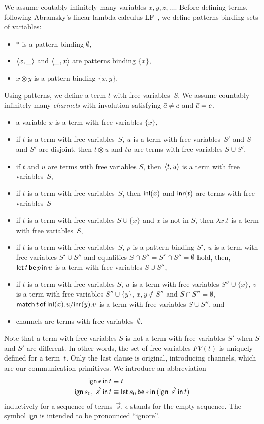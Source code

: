 We assume coutably infinitely many variables $x, y, z, \ldots$.
Before defining terms, following Abramsky's linear lambda calculus
LF~\citep{abramsky1993computational}, we define patterns
binding sets of variables:
\begin{itemize}
 \item $\ast$ is a pattern binding $\emptyset$,
 \item $\langle{x,\_}\rangle$ and $\langle{\_,x}\rangle$ are patterns binding $\{x\}$,
 \item $x\otimes y$ is a pattern binding $\{x,y\}$.
\end{itemize}
Using patterns, we define a term $t$ with free variables~$S$.
We assume countably infinitely many \textit{channels}
with involution satisfying $\bar{c}\neq c$ and $\bar{\bar{c}} = c$.
\begin{itemize}
 \item a variable $x$ is a term with free variables $\{x\}$,
 \item if $t$ is a term with free variables~$S$, $u$ is a term with
       free variables~$S'$ and $S$ and $S'$ are disjoint, then $t\otimes
       u$ and
       $tu$ are terms with free variables $S\cup S'$,
 \item if $t$ and $u$ are terms with free variables $S$, then
       $\langle{t,u}\rangle$ is a term with free variables~$S$,
 \item if $t$ is a term with free variables~$S$, then
       $\mathsf{inl}({x})$ and $\mathsf{inr}({t})$ are terms with free variables~$S$
 \item if $t$ is a term with free variables $S\cup \{x\}$ and $x$ is not
       in $S$, then $\lambda x.t$ is a term with free variables~$S$,
 \item if $t$ is a term with free variables~$S$, $p$ is a pattern
       binding $S'$, $u$ is a term with free variables $S'\cup S''$ and equalities
       $S\cap S'' = S'\cap S'' = \emptyset$ hold, then,
       $\mathsf{let }\,{t}\,\mathsf{ be }\,{p}\,\mathsf{ in }\,{u}$ is a term with free variables $S\cup S''$,
 \item if $t$ is a term with free variables $S$,
       $u$ is a term with free variables $S''\cup \{x\}$,
       $v$ is a term with free variables $S''\cup \{y\}$,
       $x,y\notin S''$ and $S\cap S'' = \emptyset$,
       $\mathsf{match}\,{t}\,\mathsf{of}\, \mathsf{inl}({x}). {u}/ \mathsf{inr}({y}). {v}$ is a term with free variables $S\cup S''$, and
 \item channels are terms with free variables~$\emptyset$.
\end{itemize}
Note that a term with free variables $S$ is not a term with free
variables $S'$ when $S$ and $S'$ are different.
In other words, the set of free variables $FV(t)$ is uniquely defined
for a term~$t$.
Only the last clause is original,
introducing channels, which are our communication primitives.
We introduce an abbreviation
\begin{align*}
 \mathsf{ign }\,{\epsilon}\,\mathsf{ in }\,{t}   & \equiv t\\
 \mathsf{ign }\,{s_0,\overrightarrow s}\,\mathsf{ in }\,{t} & \equiv \mathsf{let }\,{s_0}\,\mathsf{ be }\,{\ast}\,\mathsf{ in }\,{(\mathsf{ign }\,{\overrightarrow s}\,\mathsf{ in }\,{t})}
\end{align*}
inductively for a sequence of terms~$\vec s$.
$\epsilon$ stands for the empty sequence.
The symbol $\mathsf{ign}$ is intended to be pronounced ``ignore''.

